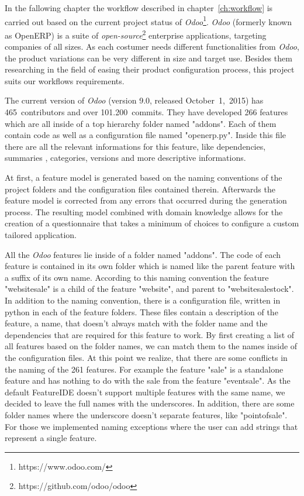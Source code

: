 
In the fallowing chapter the workflow described in chapter~\ref{ch:workflow} is carried out based on the current project status of \textit{Odoo}\footnote{https://www.odoo.com/}. \textit{Odoo} (formerly known as OpenERP) is a suite of \textit{open-source}\footnote{https://github.com/odoo/odoo} enterprise applications, targeting companies of all sizes. As each costumer needs different functionalities from \textit{Odoo}, the product variations can be very different in size and target use. Besides them researching in the field of easing their product configuration process, this project suits our workflows requirements.

The current version of \textit{Odoo} (version 9.0, released \mbox{October 1, 2015)} has 465~contributors and over 101.200~commits. They have developed 266 features which are all inside of a top hierarchy folder named "addons". Each of them contain code as well as a configuration file named "\textunderscore\textunderscore openerp\textunderscore\textunderscore.py". Inside this file there are all the relevant informations for this feature, like dependencies, summaries , categories, versions and more descriptive informations.

At first, a feature model is generated based on the naming conventions of the project folders and the configuration files contained therein. Afterwards the feature model is corrected from any errors that occurred during the generation process. The resulting model combined with domain knowledge allows for the creation of a questionnaire that takes a minimum of choices to configure a custom tailored application.

All the \textit{Odoo} features lie inside of a folder named "addons". The code of each feature is contained in its own folder which is named like the parent feature with a suffix of its own name. According to this naming convention the feature "website\textunderscore sale" is a child of the feature "website", and parent to "website\textunderscore sale\textunderscore stock". In addition to the naming convention, there is a configuration file, written in python in each of the feature folders. These files contain a description of the feature, a name, that doesn't always match with the folder name and the dependencies that are required for this feature to work.
By first creating a list of all features based on the folder names, we can match them to the names inside of the configuration files. At this point we realize, that there are some conflicts in the naming of the 261 features. For example the feature "sale" is a standalone feature and has nothing to do with the sale from the feature "event\textunderscore sale". As the default FeatureIDE doesn't support multiple features with the same name, we decided to leave the full names with the underscores. In addition, there are some folder names where the underscore doesn't separate features, like "point\textunderscore of\textunderscore sale". For those we implemented naming exceptions where the user can add strings that represent a single feature.

